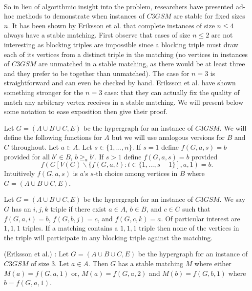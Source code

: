 \paragraph{}
So in lieu of algorithmic insight into the problem, researchers have presented ad-hoc methods to demonstrate when instances of $C3GSM$ are stable for fixed sizes $n$. It has been shown by Eriksson et al. \cite{eriksson2006three} that complete instances of size $n \leq 4$ always have a stable matching. First observe that cases of size $n \leq 2$ are not interesting as blocking triples are impossible since a blocking triple must draw each of its vertices from a distinct triple in the matching (no vertices in instances of $C3GSM$ are unmatched in a stable matching, as there would be at least three and they prefer to be together than unmatched). The case for $n=3$ is straightforward and can even be checked by hand. Eriksson et al. have shown something stronger for the $n=3$ case: that they can actually fix the quality of match any arbitrary vertex receives in a stable matching. We will present below some notation to ease exposition then give their proof.
\begin{definition}
Let $G=(A\cup B \cup C, E)$ be the hypergraph for an instance of $C3GSM$. We will define the following functions for $A$ but we will use analogous versions for $B$ and $C$ throughout. Let $a \in A$. Let $s \in \{1,\dots,n\}$. If $s=1$ define $f(G,a,s) = b$ provided for all $b' \in B$, $b \geq_a b'$. If $s>1$ define $f(G,a,s) = b$ provided $$f(G[V(G) \backslash \{f(G,a,t): t\in\{1,\dots,s-1\}], a, 1) = b.$$ Intuitively $f(G,a,s)$ is $a$'s $s$-th choice among vertices in $B$ where $G = (A\cup B \cup C, E)$.
\end{definition}
\begin{definition}
Let $G = (A \cup B \cup C, E)$ be the hypergraph for an instance of $C3GSM$. We say $G$ has an $i,j,k$ triple if there exist $a \in A$, $b\in B$, and $c \in C$ such that $f(G,a,i) = b$, $f(G,b,j) = c$, and $f(G,c,k) = a$. Of particular interest are $1,1,1$ triples. If a matching contains a $1,1,1$ triple then none of the vertices in the triple will participate in any blocking triple against the matching.
\end{definition}
\begin{lemma}\label{lemma:n3}
(Eriksson et al.) \cite{eriksson2006three}: Let $G=(A\cup B \cup C, E)$ be the hypergraph for an instance of $C3GSM$ of size $3$. Let $a \in A$. Then $G$ has a stable matching $M$ where either $M(a)= f(G,a,1)$ or, $M(a) = f(G,a,2)$ and $M(b) = f(G,b,1)$ where $b = f(G,a,1)$.
\end{lemma}
